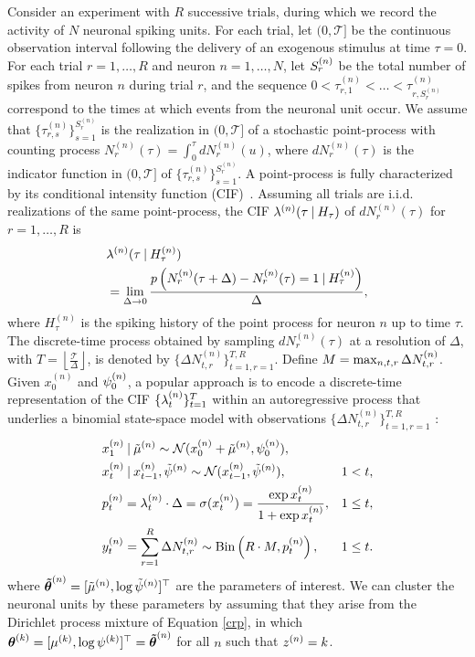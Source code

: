\documentclass[twoside]{article}
\begin{document}
Consider an experiment with $R$ successive trials, during which we record the activity of $N$ neuronal spiking units. For each trial, let $(0, \mathcal{T}]$ be the continuous observation interval following the delivery of an exogenous stimulus at time $\tau = 0$. For each trial $r = 1, \ldots, R$ and neuron $n = 1, \ldots, N$, let $\idx[r] S n$ be the total number of spikes from neuron $n$ during trial $r$, and the sequence $0 < \tau^{(n)}_{r,1}<\ldots < \tau^{(n)}_{r,S_r^{(n)}}$ correspond to the times at which events from the neuronal unit occur. We assume that {{$\{\tau^{(n)}_{r,s}\}_{s=1}^{S_r^{(n)}}$}} is the realization in $(0, \mathcal{T}] $ of a stochastic point-process with counting process $N_r^{(n)}(\tau) = \int_{0}^\tau dN_r^{(n)}(u)$, %
where $dN_r^{(n)}(\tau)$ is the indicator function in $(0, \mathcal{T}]$ of {{$\{\tau^{(n)}_{r,s}\}_{s=1}^{S_r^{(n)}}$}}. A point-process is fully characterized by its conditional intensity function (CIF)~\citep{vere2003introduction}. Assuming all trials are i.i.d. realizations of the same point-process, the CIF $\lambda^{(n)}(\tau \given H_\tau)$ of $dN_r^{(n)}(\tau)$ for $r = 1, \ldots, R$ is
\begin{align}
	&\lambda^{(n)}(\tau \given H_\tau^{(n)})  \\ \nonumber
	&=\lim_{\Delta \rightarrow 0} \frac{p\left(N_r^{(n)}(\tau+\Delta)-N_r^{(n)}(\tau)=1 \given H_\tau^{(n)}\right)}{\Delta},
\end{align}
where $H_\tau^{(n)}$ is the spiking history of the point process for neuron $n$ up to time $\tau$. The discrete-time process obtained by sampling $dN_r^{(n)}(\tau)$ at a resolution of $\Delta$, with $T = \left \lfloor \frac{\mathcal{T}}{\Delta} \right \rfloor$, is denoted by $\{\Delta N_{t,r}^{(n)}\}_{t=1,r=1}^{T,R}$.  Define $M = \max_{n, t, r} \Delta \idx[t, r] N n$. 
Given $x_0^{(n)}$ and  $\idx[0] \psi n$, a popular approach is to encode a discrete-time representation of the CIF $\{\idx[t] \lambda n\}_{t=1}^T$ within an autoregressive process that underlies a binomial state-space model with observations {{$\{\Delta N_{t,r}^{(n)}\}_{t=1,r=1}^{T,R}$}} \citep{smith2003estimating}: 
\begin{align}
	 &x_1^{(n)} \given \idx \tmu n \sim \mathcal{N}(x_0^{(n)} + \idx \tmu n, \idx[0] \psi n), \label{bssm} \\ 
	  &x_t^{(n)} \given x_{t-1}^{(n)}, \tilde{\psi}^{(n)} \sim \mathcal{N} (x_{t-1}^{(n)}, \tpsi^{(n)}),  &1 < t, \nonumber \\ 
       &\idx[t] p n = \idx[t] \lambda n \cdot \Delta = \sigma( \idx[t] x n) = \frac{\exp {x_t^{(n)}}}{1+ \exp {x_t^{(n)}}}, &1 \leq t, \nonumber \\
     & y_t^{(n)}  = \sum\limits_{r=1}^R  \Delta N_{t,r}^{(n)} \sim \text{Bin}\left(R \cdot M, \idx[t] p n\right) , &1 \leq t \nonumber.
\end{align}
where $\bidx \ttheta n = [\idx \tmu n, \log \idx \tpsi n]^\top$ are the parameters of interest.  We can cluster the neuronal units by these parameters by assuming that they arise from the Dirichlet process mixture of Equation \ref{crp}, in which $\bidx \theta k = [\idx \mu k, \log \idx \psi k]^\top = \bidx \ttheta n$ for all $n$ such that $\idx z n = k$.  
\end{document}
